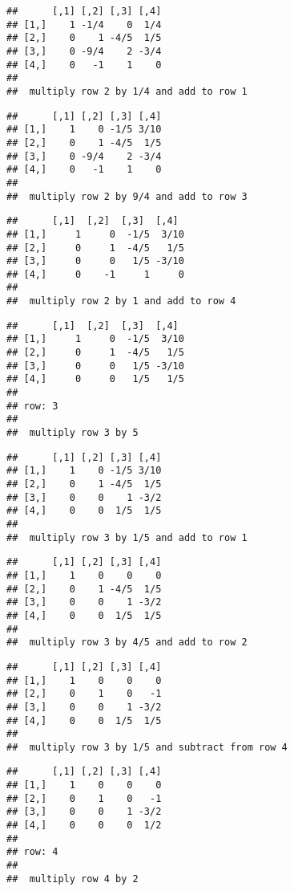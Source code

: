 \documentclass[
  10pt,
  a4paper,
]{article}
\begin{document}
\begin{verbatim}
##      [,1] [,2] [,3] [,4]
## [1,]    1 -1/4    0  1/4
## [2,]    0    1 -4/5  1/5
## [3,]    0 -9/4    2 -3/4
## [4,]    0   -1    1    0
## 
##  multiply row 2 by 1/4 and add to row 1
\end{verbatim}

\begin{verbatim}
##      [,1] [,2] [,3] [,4]
## [1,]    1    0 -1/5 3/10
## [2,]    0    1 -4/5  1/5
## [3,]    0 -9/4    2 -3/4
## [4,]    0   -1    1    0
## 
##  multiply row 2 by 9/4 and add to row 3
\end{verbatim}

\begin{verbatim}
##      [,1]  [,2]  [,3]  [,4] 
## [1,]     1     0  -1/5  3/10
## [2,]     0     1  -4/5   1/5
## [3,]     0     0   1/5 -3/10
## [4,]     0    -1     1     0
## 
##  multiply row 2 by 1 and add to row 4
\end{verbatim}

\begin{verbatim}
##      [,1]  [,2]  [,3]  [,4] 
## [1,]     1     0  -1/5  3/10
## [2,]     0     1  -4/5   1/5
## [3,]     0     0   1/5 -3/10
## [4,]     0     0   1/5   1/5
## 
## row: 3 
## 
##  multiply row 3 by 5
\end{verbatim}

\begin{verbatim}
##      [,1] [,2] [,3] [,4]
## [1,]    1    0 -1/5 3/10
## [2,]    0    1 -4/5  1/5
## [3,]    0    0    1 -3/2
## [4,]    0    0  1/5  1/5
## 
##  multiply row 3 by 1/5 and add to row 1
\end{verbatim}

\begin{verbatim}
##      [,1] [,2] [,3] [,4]
## [1,]    1    0    0    0
## [2,]    0    1 -4/5  1/5
## [3,]    0    0    1 -3/2
## [4,]    0    0  1/5  1/5
## 
##  multiply row 3 by 4/5 and add to row 2
\end{verbatim}

\begin{verbatim}
##      [,1] [,2] [,3] [,4]
## [1,]    1    0    0    0
## [2,]    0    1    0   -1
## [3,]    0    0    1 -3/2
## [4,]    0    0  1/5  1/5
## 
##  multiply row 3 by 1/5 and subtract from row 4
\end{verbatim}

\begin{verbatim}
##      [,1] [,2] [,3] [,4]
## [1,]    1    0    0    0
## [2,]    0    1    0   -1
## [3,]    0    0    1 -3/2
## [4,]    0    0    0  1/2
## 
## row: 4 
## 
##  multiply row 4 by 2
\end{verbatim}
\end{document}
